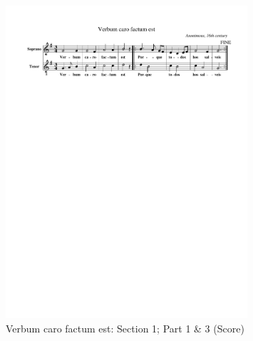 \vspace{-1.30cm}
\begin{figure}[h]
  \begin{center}
    \includegraphics[width=0.8\textwidth, clip=true, trim = 15mm 210mm 15mm 0mm]{img/verbum_s1_p1_p3.pdf}
    \caption{Verbum caro factum est: Section 1; Part 1 \& 3 (Score)}
    \label{fig:verbum_s1_p1_p3_score}
  \end{center}
\end{figure}
